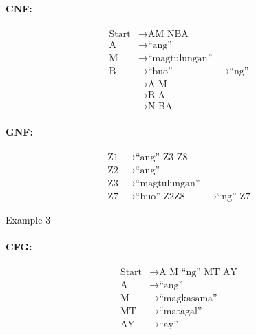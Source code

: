 \paragraph{CNF:}
\begin{equation*}
    \begin{aligned}
        \text{Start}   & \rightarrow \text{AM NBA}   \\
        \text{A} & \rightarrow \text{“ang”} \\
        \text{M} & \rightarrow \text{“magtulungan”} \\
        \text{B} & \rightarrow \text{“buo”}
        \text{} & \rightarrow \text{“ng”} \\
        \text{} & \rightarrow \text{A M} \\
        \text{} & \rightarrow \text{B A} \\
        \text{} & \rightarrow \text{N BA}
    \end{aligned}
\end{equation*}

\paragraph{GNF:}
\begin{equation*}
    \begin{aligned}
        \text{Z1}   & \rightarrow \text{“ang” Z3 Z8}   \\
        \text{Z2} & \rightarrow \text{“ang”} \\
        \text{Z3} & \rightarrow \text{“magtulungan”} \\
        \text{Z7} & \rightarrow \text{“buo” Z2}
        \text{Z8} & \rightarrow \text{“ng” Z7}
    \end{aligned}
\end{equation*}

Example 3
\paragraph{CFG:}
\begin{equation*}
    \begin{aligned}
        \text{Start}   & \rightarrow \text{A M “ng” MT AY}   \\
        \text{A} & \rightarrow \text{“ang”} \\
        \text{M} & \rightarrow \text{“magkasama”} \\
        \text{MT} & \rightarrow \text{“matagal”} \\
        \text{AY} & \rightarrow \text{“ay”} \\
    \end{aligned}
\end{equation*}

